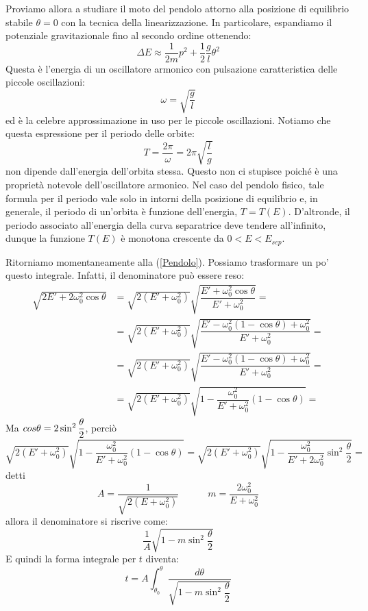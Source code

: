 \documentclass[a4paper,openany]{article}
\begin{document}
	Proviamo allora a studiare il moto del pendolo attorno alla posizione di equilibrio stabile $\theta = 0$ con la tecnica della linearizzazione. In particolare, espandiamo il potenziale gravitazionale fino al secondo ordine ottenendo:
	$$
	\Delta E \approx \dfrac{1}{2m}p^2 + \dfrac{1}{2}\dfrac{g}{l}\theta^2
	$$
	Questa è l'energia di un oscillatore armonico con pulsazione caratteristica delle piccole oscillazioni:
	$$
	\omega = \sqrt{\dfrac{g}{l}}
	$$
	ed è la celebre approssimazione in uso per le piccole oscillazioni. Notiamo che questa espressione per il periodo delle orbite:
	$$
	T = \dfrac{2\pi}{\omega} = 2\pi \sqrt{\dfrac{l}{g}}
	$$
	non dipende dall'energia dell'orbita stessa. Questo non ci stupisce poiché è una proprietà notevole dell'oscillatore armonico. Nel caso del pendolo fisico, tale formula per il periodo vale solo in intorni della posizione di equilibrio e, in generale, il periodo di un'orbita è funzione dell'energia, $T = T(E)$. D'altronde, il periodo associato all'energia della curva separatrice deve tendere all'infinito, dunque la funzione $T(E)$ è monotona crescente da $0 <E < E_{sep}$.
	
	Ritorniamo momentaneamente alla (\ref{Pendolo}). Possiamo trasformare un po' questo integrale. Infatti, il denominatore può essere reso:
	\begin{equation}
		\begin{aligned}
			\sqrt{2E'+2\omega_0^2 \cos\theta} &= \sqrt{2(E'+\omega_0^2)}\sqrt{\dfrac{E'+\omega_0^2 \cos\theta}{E'+\omega_0^2}} = \\
			&=   \sqrt{2(E'+\omega_0^2)}\sqrt{\dfrac{E'-\omega_0^2 (1-\cos\theta)+\omega_0^2}{E'+\omega_0^2}} = \\
			&= \sqrt{2(E'+\omega_0^2)}\sqrt{\dfrac{E'-\omega_0^2 (1-\cos\theta)+\omega_0^2}{E'+\omega_0^2}} = \\
			&= \sqrt{2(E'+\omega_0^2)}\sqrt{1-\dfrac{\omega_0^2}{E'+\omega_0^2}(1-\cos\theta)} =
		\end{aligned} 
	\end{equation} 
	Ma $\-cos\theta =2 \sin^{2}\dfrac{\theta}{2}$, perciò
	\begin{equation}\label{key}
		\sqrt{2(E'+\omega_0^2)}\sqrt{1-\dfrac{\omega_0^2}{E'+\omega_0^2}(1-\cos\theta)} =  \sqrt{2(E'+\omega_0^2)}\sqrt{1-\dfrac{\omega_0^2}{E'+2\omega_0^2} \sin^{2}\dfrac{\theta}{2}} =
	\end{equation}
	detti
	\begin{equation}\label{key}
		A = \dfrac{1}{\sqrt{2(E+\omega_0^2)}}  \quad \quad \quad m = \dfrac{2\omega_0^2}{E+\omega_0^2}
	\end{equation}
	allora il denominatore si riscrive come:
	\begin{equation}\label{key}
		\dfrac{1}{A}\sqrt{1-m\sin^{2}\dfrac{\theta}{2}}
	\end{equation}
	E quindi la forma integrale per $t$ diventa:
	\begin{equation}\label{key}
		t = A\int_{\theta_0}^{\theta}\dfrac{d\theta}{\sqrt{1-m\sin^{2}\dfrac{\theta}{2}}}
	\end{equation}
	
\end{document}
